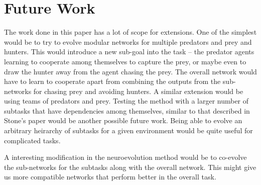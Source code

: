 \section{Future Work}
The work done in this paper has a lot of scope for extensions. One of the simplest would be to try to evolve modular networks for multiple predators and prey and hunters. This would introduce a new sub-goal into the task -- the predator agents learning to cooperate among themselves to capture the prey, or maybe even to draw the hunter away from the agent chasing the prey. The overall network would have to learn to cooperate apart from combining the outputs from the sub-networks for chasing prey and avoiding hunters. A similar extension would be using teams of predators and prey.
    Testing the method with a larger number of subtasks that have dependencies among themselves, similar to that described in Stone’s paper would be another possible future work. Being able to evolve an arbitrary heirarchy of subtasks for a given environment would be quite useful for complicated tasks.

A interesting modification in the neuroevolution method would be to co-evolve the sub-networks for the subtasks along with the overall network. This might give us more compatible networks that perform better in the overall task.
